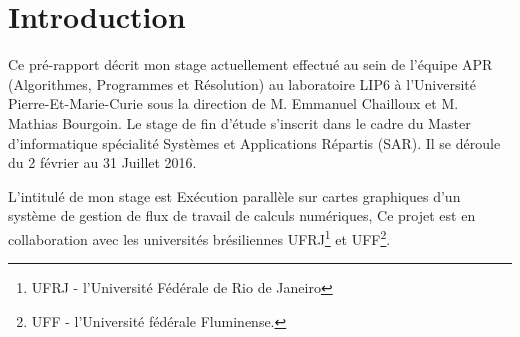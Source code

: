\chapter{Introduction} %

Ce pré-rapport décrit mon stage actuellement effectué au sein de l'équipe  APR (Algorithmes, Programmes et Résolution) au laboratoire LIP6 à l'Université Pierre-Et-Marie-Curie sous la direction de M. Emmanuel Chailloux et M. Mathias Bourgoin. Le stage de fin d'étude s'inscrit dans le cadre du Master d'informatique spécialité Systèmes et Applications Répartis (SAR). Il se déroule du 2 février au 31 Juillet 2016.

L'intitulé de mon stage est  \og Exécution parallèle sur cartes graphiques d'un système de gestion de flux de travail de calculs numériques\fg{}, Ce projet est en collaboration avec les universités brésiliennes UFRJ\footnote{UFRJ -   l'Université Fédérale de Rio de Janeiro} et UFF\footnote{UFF - l'Université fédérale Fluminense.}.
\noindent





